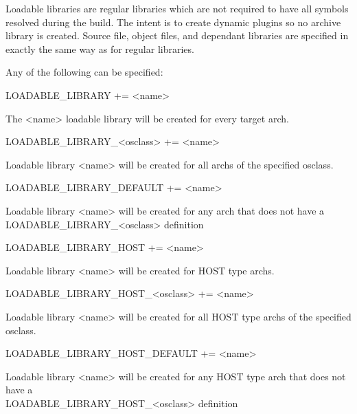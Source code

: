 
Loadable libraries are regular libraries which are not required to have all symbols resolved during the build. The intent is 
to create dynamic plugins so no archive library is created. Source file, object files, and dependant libraries are specified in 
exactly the same way as for regular libraries.

Any of the following can be specified:

\begin{description}\item {}LOADABLE\_LIBRARY += \textless{}name\textgreater{}

The \textless{}name\textgreater{} loadable library will be created for every target arch.

\item LOADABLE\_LIBRARY\_\textless{}osclass\textgreater{} += \textless{}name\textgreater{}

Loadable library \textless{}name\textgreater{} will be created for all archs of the specified osclass.

\item LOADABLE\_LIBRARY\_DEFAULT += \textless{}name\textgreater{}

Loadable library \textless{}name\textgreater{} will be created for any arch that does not have a 
LOADABLE\_LIBRARY\_\textless{}osclass\textgreater{} definition

\item 

\item {}LOADABLE\_LIBRARY\_HOST += \textless{}name\textgreater{}

Loadable library \textless{}name\textgreater{} will be created for HOST type archs.

\item LOADABLE\_LIBRARY\_HOST\_\textless{}osclass\textgreater{} += \textless{}name\textgreater{}

Loadable library \textless{}name\textgreater{} will be created for all HOST type archs of the specified osclass.

\item LOADABLE\_LIBRARY\_HOST\_DEFAULT += \textless{}name\textgreater{}

Loadable library \textless{}name\textgreater{} will be created for any HOST type arch that does not have a \\
LOADABLE\_LIBRARY\_HOST\_\textless{}osclass\textgreater{} definition

\end{description}

